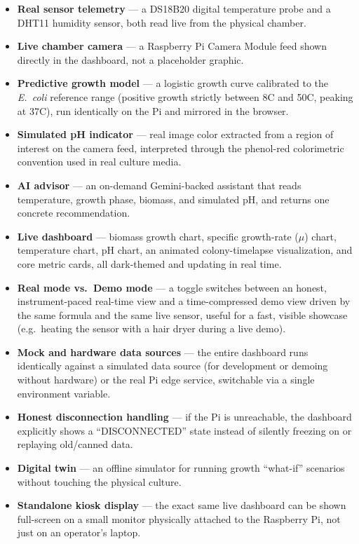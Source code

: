 \documentclass[11pt]{article}
\begin{document}
\begin{itemize}
    \item \textbf{Real sensor telemetry} --- a DS18B20 digital temperature probe and a DHT11 humidity sensor, both read live from the physical chamber.
    \item \textbf{Live chamber camera} --- a Raspberry Pi Camera Module feed shown directly in the dashboard, not a placeholder graphic.
    \item \textbf{Predictive growth model} --- a logistic growth curve calibrated to the \emph{E.~coli} reference range (positive growth strictly between 8\textdegree{}C and 50\textdegree{}C, peaking at 37\textdegree{}C), run identically on the Pi and mirrored in the browser.
    \item \textbf{Simulated pH indicator} --- real image color extracted from a region of interest on the camera feed, interpreted through the phenol-red colorimetric convention used in real culture media.
    \item \textbf{AI advisor} --- an on-demand Gemini-backed assistant that reads temperature, growth phase, biomass, and simulated pH, and returns one concrete recommendation.
    \item \textbf{Live dashboard} --- biomass growth chart, specific growth-rate (\(\mu\)) chart, temperature chart, pH chart, an animated colony-timelapse visualization, and core metric cards, all dark-themed and updating in real time.
    \item \textbf{Real mode vs.\ Demo mode} --- a toggle switches between an honest, instrument-paced real-time view and a time-compressed demo view driven by the same formula and the same live sensor, useful for a fast, visible showcase (e.g.\ heating the sensor with a hair dryer during a live demo).
    \item \textbf{Mock and hardware data sources} --- the entire dashboard runs identically against a simulated data source (for development or demoing without hardware) or the real Pi edge service, switchable via a single environment variable.
    \item \textbf{Honest disconnection handling} --- if the Pi is unreachable, the dashboard explicitly shows a ``DISCONNECTED'' state instead of silently freezing on or replaying old/canned data.
    \item \textbf{Digital twin} --- an offline simulator for running growth ``what-if'' scenarios without touching the physical culture.
    \item \textbf{Standalone kiosk display} --- the exact same live dashboard can be shown full-screen on a small monitor physically attached to the Raspberry Pi, not just on an operator's laptop.
\end{itemize}
\end{document}
